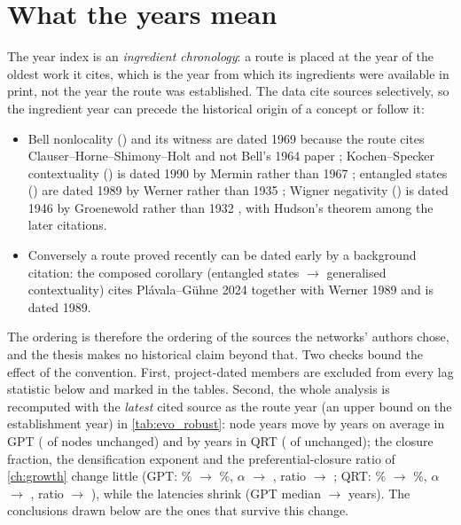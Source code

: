 \section{What the years mean}\label{sec:dating-caveat}
The year index is an \emph{ingredient chronology}: a route is placed at the year of the oldest work it cites, which is the year from which its ingredients were available in print, not the year the route was established. The data cite sources selectively, so the ingredient year can precede the historical origin of a concept or follow it:
\begin{itemize}[nosep]
\item Bell nonlocality () and its witness are dated 1969 because the route cites Clauser--Horne--Shimony--Holt \citep{chsh1969} and not Bell's 1964 paper \citep{bell1964}; Kochen--Specker contextuality () is dated 1990 by Mermin \citep{mermin1990} rather than 1967 \citep{kochen1967}; entangled states () are dated 1989 by Werner \citep{werner1989} rather than 1935 \citep{epr1935,schrodinger1935}; Wigner negativity () is dated 1946 by Groenewold \citep{groenewold1946} rather than 1932 \citep{wigner1932}, with Hudson's theorem \citep{hudson1974} among the later citations.
\item Conversely a route proved recently can be dated early by a background citation: the composed corollary  (entangled states $\to$ generalised contextuality) cites Plávala--Gühne 2024 together with Werner 1989 and is dated 1989.
\end{itemize}
The ordering is therefore the ordering of the sources the networks' authors chose, and the thesis makes no historical claim beyond that. Two checks bound the effect of the convention. First, project-dated members are excluded from every lag statistic below and marked in the tables. Second, the whole analysis is recomputed with the \emph{latest} cited source as the route year (an upper bound on the establishment year) in \cref{tab:evo_robust}: node years move by \EGPTMaxShiftMean{} years on average in GPT (\EGPTMaxShiftZero{} of \EGPTVfin{} nodes unchanged) and by \EQRTMaxShiftMean{} years in QRT (\EQRTMaxShiftZero{} of \EQRTVfin{} unchanged); the closure fraction, the densification exponent and the preferential-closure ratio of \cref{ch:growth} change little (GPT: \EGPTClosureFrac\% $\to$ \EGPTMaxClosureFrac\%, $\alpha$ \EGPTAlpha{} $\to$ \EGPTMaxAlpha{}, ratio \EGPTPAratio{} $\to$ \EGPTMaxPAratio{}; QRT: \EQRTClosureFrac\% $\to$ \EQRTMaxClosureFrac\%, $\alpha$ \EQRTAlpha{} $\to$ \EQRTMaxAlpha{}, ratio \EQRTPAratio{} $\to$ \EQRTMaxPAratio{}), while the latencies shrink (GPT median \EGPTLatMedian{} $\to$ \EGPTMaxLatMedian{} years). The conclusions drawn below are the ones that survive this change.

